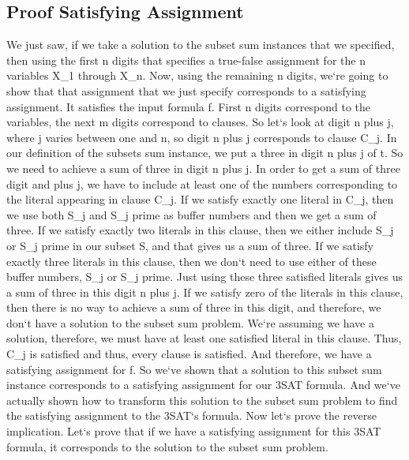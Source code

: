 \subsection{Proof  Satisfying Assignment}
We just saw, if we take a solution to the subset sum instances that we specified, then using the first n digits that specifies a true-false assignment for the n variables X\_1 through X\_n.
Now, using the remaining n digits, we`re going to show that that assignment that we just specify corresponds to a satisfying assignment.
It satisfies the input formula f.
First n digits correspond to the variables, the next m digits correspond to clauses.
So let`s look at digit n plus j, where j varies between one and n, so digit n plus j corresponds to clause C\_j.
In our definition of the subsets sum instance, we put a three in digit n plus j of t.
So we need to achieve a sum of three in digit n plus j.
In order to get a sum of three digit and plus j, we have to include at least one of the numbers corresponding to the literal appearing in clause C\_j.
If we satisfy exactly one literal in C\_j, then we use both S\_j and S\_j prime as buffer numbers and then we get a sum of three.
If we satisfy exactly two literals in this clause, then we either include S\_j or S\_j prime in our subset S, and that gives us a sum of three.
If we satisfy exactly three literals in this clause, then we don`t need to use either of these buffer numbers, S\_j or S\_j prime.
Just using these three satisfied literals gives us a sum of three in this digit n plus j.
If we satisfy zero of the literals in this clause, then there is no way to achieve a sum of three in this digit, and therefore, we don`t have a solution to the subset sum problem.
We`re assuming we have a solution, therefore, we must have at least one satisfied literal in this clause.
Thus, C\_j is satisfied and thus, every clause is satisfied.
And therefore, we have a satisfying assignment for f.
So we`ve shown that a solution to this subset sum instance corresponds to a satisfying assignment for our 3SAT formula.
And we`ve actually shown how to transform this solution to the subset sum problem to find the satisfying assignment to the 3SAT`s formula.
Now let`s prove the reverse implication.
Let`s prove that if we have a satisfying assignment for this 3SAT formula, it corresponds to the solution to the subset sum problem.

